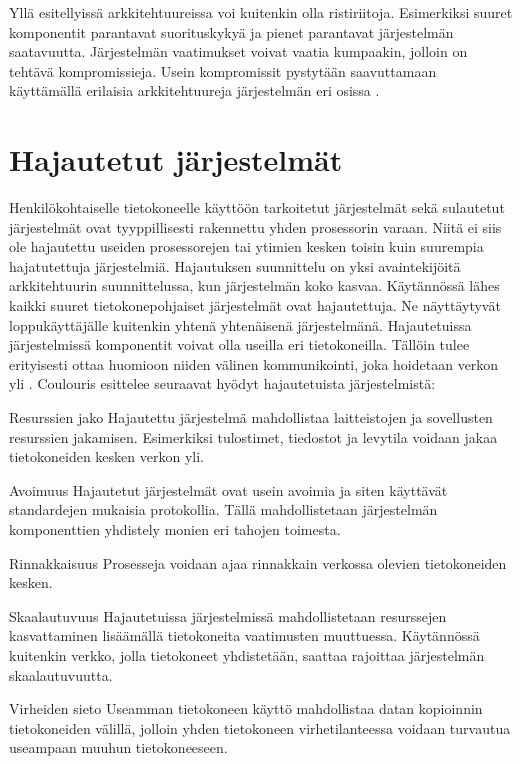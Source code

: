 \documentclass[utf8]{gradu3}
\begin{document}
Yllä esitellyissä arkkitehtuureissa voi kuitenkin olla ristiriitoja. Esimerkiksi suuret komponentit parantavat suorituskykyä  ja pienet parantavat järjestelmän saatavuutta. Järjestelmän vaatimukset voivat vaatia kumpaakin, jolloin on tehtävä kompromissieja. Usein kompromissit pystytään saavuttamaan käyttämällä erilaisia arkkitehtuureja järjestelmän eri osissa \parencite[s.152]{Sommerville}. 

\pagebreak

\section{Hajautetut järjestelmät}
Henkilökohtaiselle tietokoneelle käyttöön tarkoitetut järjestelmät sekä sulautetut järjestelmät ovat tyyppillisesti rakennettu yhden prosessorin varaan. Niitä ei siis ole hajautettu useiden prosessorejen tai ytimien kesken toisin kuin suurempia hajatutettuja järjestelmiä. Hajautuksen suunnittelu on yksi avaintekijöitä arkkitehtuurin suunnittelussa, kun järjestelmän koko kasvaa. Käytännössä lähes kaikki suuret tietokonepohjaiset järjestelmät ovat hajautettuja. Ne näyttäytyvät loppukäyttäjälle kuitenkin yhtenä yhtenäisenä järjestelmänä. Hajautetuissa järjestelmissä komponentit voivat olla useilla eri tietokoneilla. Tällöin tulee erityisesti ottaa huomioon niiden välinen kommunikointi, joka hoidetaan verkon yli \parencite[s. 480]{Sommerville}. Coulouris \parencite{Coulouris} esittelee seuraavat hyödyt hajautetuista järjestelmistä:

\begin{desclist}
\item[Resurssien jako] Hajautettu järjestelmä mahdollistaa laitteistojen ja sovellusten resurssien jakamisen. Esimerkiksi tulostimet, tiedostot ja levytila voidaan jakaa tietokoneiden kesken verkon yli.
\item[Avoimuus] Hajautetut järjestelmät ovat usein avoimia ja siten käyttävät standardejen mukaisia protokollia. Tällä mahdollistetaan järjestelmän komponenttien yhdistely monien eri tahojen toimesta.  
\item[Rinnakkaisuus] Prosesseja voidaan ajaa rinnakkain verkossa olevien tietokoneiden kesken.
\item[Skaalautuvuus] Hajautetuissa järjestelmissä mahdollistetaan resurssejen kasvattaminen lisäämällä tietokoneita vaatimusten muuttuessa. Käytännössä kuitenkin verkko, jolla tietokoneet yhdistetään, saattaa rajoittaa järjestelmän skaalautuvuutta.
\item[Virheiden sieto] Useamman tietokoneen käyttö mahdollistaa datan kopioinnin tietokoneiden välillä, jolloin yhden tietokoneen virhetilanteessa voidaan turvautua useampaan muuhun tietokoneeseen. 
\end{desclist}
\end{document}
